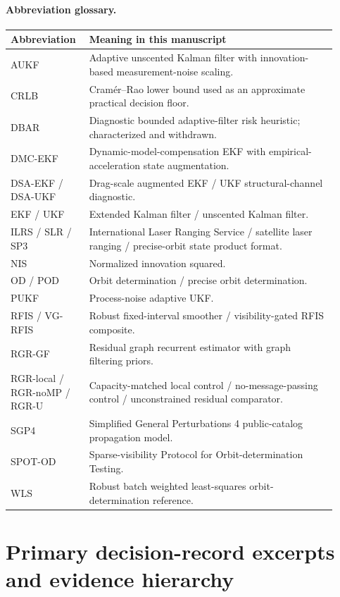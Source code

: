 \documentclass{article}
\begin{document}
\paragraph{Abbreviation glossary.}
\begin{center}
\scriptsize
\begin{tabular}{p{0.20\linewidth}p{0.72\linewidth}}
\toprule
Abbreviation & Meaning in this manuscript \\
\midrule
AUKF & Adaptive unscented Kalman filter with innovation-based measurement-noise scaling. \\
CRLB & Cram\'er--Rao lower bound used as an approximate practical decision floor. \\
DBAR & Diagnostic bounded adaptive-filter risk heuristic; characterized and withdrawn. \\
DMC-EKF & Dynamic-model-compensation EKF with empirical-acceleration state augmentation. \\
DSA-EKF / DSA-UKF & Drag-scale augmented EKF / UKF structural-channel diagnostic. \\
EKF / UKF & Extended Kalman filter / unscented Kalman filter. \\
ILRS / SLR / SP3 & International Laser Ranging Service / satellite laser ranging / precise-orbit state product format. \\
NIS & Normalized innovation squared. \\
OD / POD & Orbit determination / precise orbit determination. \\
PUKF & Process-noise adaptive UKF. \\
RFIS / VG-RFIS & Robust fixed-interval smoother / visibility-gated RFIS composite. \\
RGR-GF & Residual graph recurrent estimator with graph filtering priors. \\
RGR-local / RGR-noMP / RGR-U & Capacity-matched local control / no-message-passing control / unconstrained residual comparator. \\
SGP4 & Simplified General Perturbations 4 public-catalog propagation model. \\
SPOT-OD & Sparse-visibility Protocol for Orbit-determination Testing. \\
WLS & Robust batch weighted least-squares orbit-determination reference. \\
\bottomrule
\end{tabular}
\end{center}

\section{Primary decision-record excerpts and evidence hierarchy}
\label{app:predeclaration-excerpts}
\end{document}
